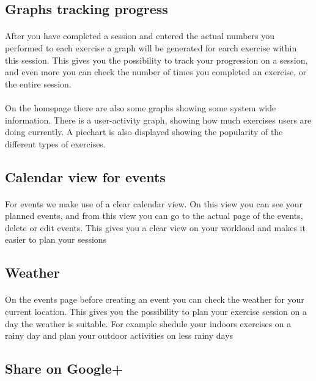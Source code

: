 \documentclass[11pt,a4paper]{scrartcl}
\begin{document}
\subsection{Graphs tracking progress}
\paragraph{}After you have completed a session and entered the actual numbers you performed to each exercise a graph will be generated for earch exercise within this session. This gives you the possibility to track your progression on a session, and even more you can check the number of times you completed an exercise, or the entire session.
\paragraph{}On the homepage there are also some graphs showing some system wide information. There is a user-activity graph, showing how much exercises users are doing currently. A piechart is also displayed showing the popularity of the different types of exercises.
\subsection{Calendar view for events}
\paragraph{}For events we make use of a clear calendar view. On this view you can see your planned events, and from this view you can go to the actual page of the events, delete or edit events. This gives you a clear view on your workload and makes it easier to plan your sessions

\subsection{Weather}
\paragraph{}On the events page before creating an event you can check the weather for your current location. This gives you the possibility to plan your exercise session on a day the weather is suitable. For example shedule your indoors exercises on a rainy day and plan your outdoor activities on less rainy days
\subsection{Share on Google+}
\end{document}
